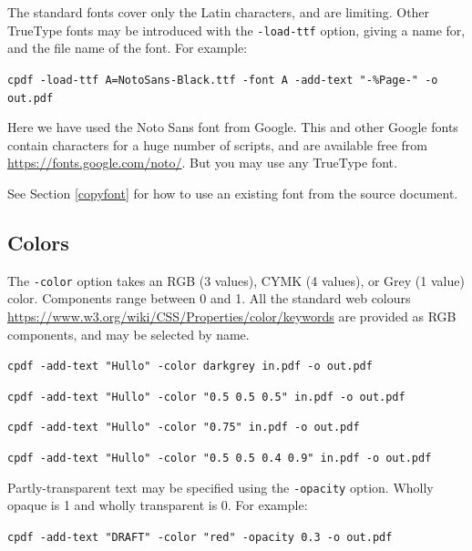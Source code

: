 \documentclass{book}
\begin{document}
The standard fonts cover only the Latin characters, and are limiting. Other TrueType fonts may be introduced with the \texttt{-load-ttf} option, giving a name for, and the file name of the font. For example:

  \begin{framed}
    \noindent\small\verb!cpdf -load-ttf A=NotoSans-Black.ttf -font A -add-text "-%Page-" -o out.pdf!
  \end{framed}

\noindent Here we have used the Noto Sans font from Google. This and other Google fonts contain characters for a huge number of scripts, and are available free from \url{https://fonts.google.com/noto/}. But you may use any TrueType font.

See Section \ref{copyfont} for how to use an existing font from the source document.

  \subsection{Colors}
  The \texttt{-color} option takes an RGB (3 values), CYMK (4 values), or Grey (1 value) color. Components range between 0 and 1. All the standard web colours \url{https://www.w3.org/wiki/CSS/Properties/color/keywords} are provided as RGB components, and may be selected by name.

  \begin{framed}
    \noindent\small\verb!cpdf -add-text "Hullo" -color darkgrey in.pdf -o out.pdf!
    
    \vspace{1.5mm}
    \noindent\small\verb!cpdf -add-text "Hullo" -color "0.5 0.5 0.5" in.pdf -o out.pdf!

    \vspace{1.5mm}
    \noindent\small\verb!cpdf -add-text "Hullo" -color "0.75" in.pdf -o out.pdf!

    \vspace{1.5mm}
    \noindent\small\verb!cpdf -add-text "Hullo" -color "0.5 0.5 0.4 0.9" in.pdf -o out.pdf!
  \end{framed}

\noindent Partly-transparent text may be specified using the \verb!-opacity! option. Wholly opaque is 1 and wholly transparent is 0. For example:

\begin{framed}
  \noindent\small\verb!cpdf -add-text "DRAFT" -color "red" -opacity 0.3 -o out.pdf!
\end{framed}
\end{document}
